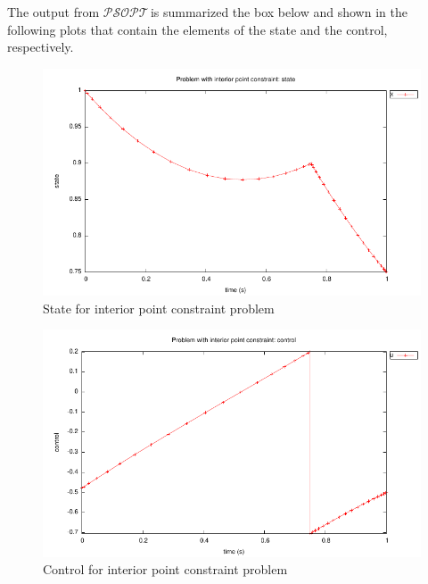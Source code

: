 \documentclass[a4paper,11pt]{report}    %
\newcommand{\psopt}{$\mathcal{PSOPT}$\,}  %
\newenvironment{shadedframe}{%
  \def\FrameCommand{\fcolorbox{black}{shadecolor}}%
  \MakeFramed {\FrameRestore}}
{\endMakeFramed}
\begin{document}
\tiny
\begin{shadedframe}

\end{shadedframe}
\normalsize
The output from \psopt is summarized the box below and shown in the following plots that contain the elements
of the state and the control, respectively.

\begin{shadedframe}

\end{shadedframe}



\begin{figure}
  \centering
  \includegraphics{../examples/ipc/ipc_state}
  \caption{State for interior point constraint problem}
\end{figure}


\begin{figure}
  \centering
  \includegraphics{../examples/ipc/ipc_control}
  \caption{Control for interior point constraint problem}
\end{figure}
\end{document}
